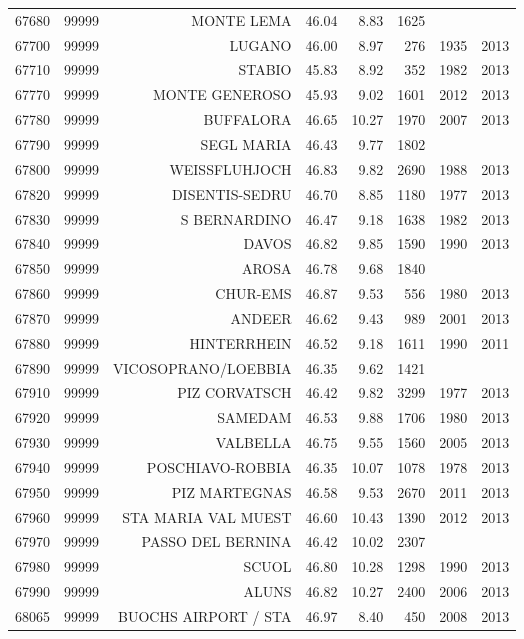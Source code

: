 \begin{longtable}{rrrrrrrr}
  67680 & 99999 & MONTE LEMA & 46.04 & 8.83 & 1625 &  &  \\ 
  67700 & 99999 & LUGANO & 46.00 & 8.97 & 276 & 1935 & 2013 \\ 
  67710 & 99999 & STABIO & 45.83 & 8.92 & 352 & 1982 & 2013 \\ 
  67770 & 99999 & MONTE GENEROSO & 45.93 & 9.02 & 1601 & 2012 & 2013 \\ 
  67780 & 99999 & BUFFALORA & 46.65 & 10.27 & 1970 & 2007 & 2013 \\ 
  67790 & 99999 & SEGL MARIA & 46.43 & 9.77 & 1802 &  &  \\ 
  67800 & 99999 & WEISSFLUHJOCH & 46.83 & 9.82 & 2690 & 1988 & 2013 \\ 
  67820 & 99999 & DISENTIS-SEDRU & 46.70 & 8.85 & 1180 & 1977 & 2013 \\ 
  67830 & 99999 & S BERNARDINO & 46.47 & 9.18 & 1638 & 1982 & 2013 \\ 
  67840 & 99999 & DAVOS & 46.82 & 9.85 & 1590 & 1990 & 2013 \\ 
  67850 & 99999 & AROSA & 46.78 & 9.68 & 1840 &  &  \\ 
  67860 & 99999 & CHUR-EMS & 46.87 & 9.53 & 556 & 1980 & 2013 \\ 
  67870 & 99999 & ANDEER & 46.62 & 9.43 & 989 & 2001 & 2013 \\ 
  67880 & 99999 & HINTERRHEIN & 46.52 & 9.18 & 1611 & 1990 & 2011 \\ 
  67890 & 99999 & VICOSOPRANO/LOEBBIA & 46.35 & 9.62 & 1421 &  &  \\ 
  67910 & 99999 & PIZ CORVATSCH & 46.42 & 9.82 & 3299 & 1977 & 2013 \\ 
  67920 & 99999 & SAMEDAM & 46.53 & 9.88 & 1706 & 1980 & 2013 \\ 
  67930 & 99999 & VALBELLA & 46.75 & 9.55 & 1560 & 2005 & 2013 \\ 
  67940 & 99999 & POSCHIAVO-ROBBIA & 46.35 & 10.07 & 1078 & 1978 & 2013 \\ 
  67950 & 99999 & PIZ MARTEGNAS & 46.58 & 9.53 & 2670 & 2011 & 2013 \\ 
  67960 & 99999 & STA MARIA VAL MUEST & 46.60 & 10.43 & 1390 & 2012 & 2013 \\ 
  67970 & 99999 & PASSO DEL BERNINA & 46.42 & 10.02 & 2307 &  &  \\ 
  67980 & 99999 & SCUOL & 46.80 & 10.28 & 1298 & 1990 & 2013 \\ 
  67990 & 99999 & ALUNS & 46.82 & 10.27 & 2400 & 2006 & 2013 \\ 
  68065 & 99999 & BUOCHS AIRPORT / STA & 46.97 & 8.40 & 450 & 2008 & 2013 \\ 

\end{longtable}
